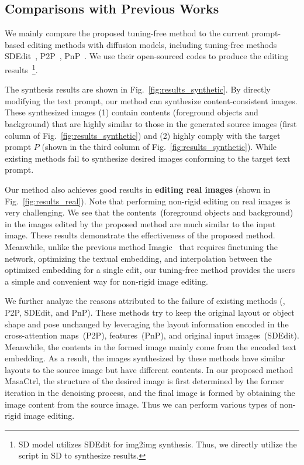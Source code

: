 \documentclass[10pt,twocolumn,letterpaper]{article}
\begin{document}
\subsection{Comparisons with Previous Works}
We mainly compare the proposed tuning-free method to the current prompt-based editing methods with diffusion models, including tuning-free methods SDEdit~\cite{meng2021sdedit}, P2P~\cite{hertz2022prompt}, PnP~\cite{tumanyan2022plug}. We use their open-sourced codes to produce the editing results~\footnote{SD model utilizes SDEdit for img2img synthesis. Thus, we directly utilize the script in SD to synthesize results.}. 

The synthesis results are shown in Fig.~\ref{fig:results_synthetic}. By directly modifying the text prompt, our method can synthesize content-consistent images. These synthesized images (1) contain contents (foreground objects and background) that are highly similar to those in the generated source images (first column  of Fig.~\ref{fig:results_synthetic}) and (2) highly comply with the target prompt $P$ (shown in the third column of Fig.~\ref{fig:results_synthetic}). While existing methods fail to synthesize desired images conforming to the target text prompt.

Our method also achieves good results in \textbf{editing real images} (shown in Fig.~\ref{fig:results_real}). Note that performing non-rigid editing on real images is very challenging. 
We see that the contents~(foreground objects and background) in the images edited by the proposed method are much similar to the input image. These results demonstrate the effectiveness of the proposed method. Meanwhile, unlike the previous method Imagic~\cite{kawar2022imagic} that requires finetuning the network, optimizing the textual embedding, and interpolation between the optimized embedding for a single edit, our tuning-free method provides the users a simple and convenient way for non-rigid image editing.

We further analyze the reasons attributed to the failure of existing methods (\ie, P2P, SDEdit, and PnP). These methods try to keep the original layout or object shape and pose unchanged by leveraging the layout information encoded in the cross-attention maps~(P2P), features~(PnP), and original input images~(SDEdit). Meanwhile, the contents in the formed image mainly come from the encoded text embedding. As a result, the images synthesized by these methods have similar layouts to the source image but have different contents. 
In our proposed method MasaCtrl, the structure of the desired image is first determined by the former iteration in the denoising process, and the final image is formed by obtaining the image content from the source image. Thus we can perform various types of non-rigid image editing.
\end{document}
